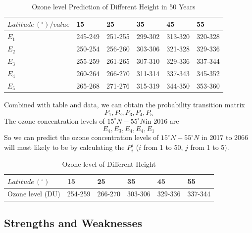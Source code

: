 \documentclass[12pt]{article}
\begin{document}
\begin{center}
\begin{table}[H]
	\caption{Ozone level Prediction of Different Height in 50 Years}\label{tab:thi}
\begin{center}
\begin{tabular}{llllll}
\hline
    ${Latitude \, (^{\circ})} / {value}$ & 15 & 25 & 35 & 45 & 55 \\
\hline
$E_1$ & 245-249 & 251-255 & 299-302 & 313-320 & 320-328\\
$E_2$ & 250-254 & 256-260 & 303-306 & 321-328 & 329-336\\
$E_3$ & 255-259 & 261-265 & 307-310 & 329-336 & 337-344\\
$E_4$ & 260-264 & 266-270 & 311-314 & 337-343 & 345-352\\
$E_5$ & 265-268 & 271-276 & 315-319 & 344-350 & 353-360\\
\hline
\end{tabular}
\end{center}
\end{table}
\end{center}

Combined with table and data, we can obtain the probability transition matrix $$P_1, P_2, P_3, P_4, P_5$$ The ozone concentration levels of $15^{\circ}N - 55^ {\circ}N$in 2016 are $$E_4, E_3, E_4, E_4, E_1$$ So we can predict the ozone concentration levels of $15^{\circ}N - 55^ {\circ}N$ in 2017 to 2066 will most likely to be by calculating the $P_i^j$ ($i$ from 1 to 50, $j$ from 1 to 5).

\begin{center}
\begin{table}[H]
	\caption{Ozone level of Different Height}\label{tab:thi}
\begin{center}
\begin{tabular}{llllll}
\hline
    $Latitude \, (^{\circ})$ & 15 & 25 & 35 & 45 & 55 \\
\hline
Ozone level (DU) & 254-259 & 266-270 & 303-306 & 329-336 & 337-344\\
\hline
\end{tabular}
\end{center}
\end{table}
\end{center}


\subsection{Strengths and Weaknesses}
\end{document}
